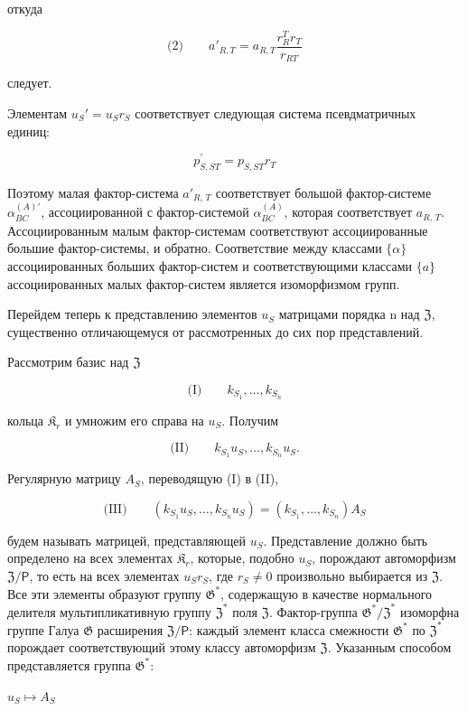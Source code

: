 \documentclass[11pt]{article}
\begin{document}
откуда

\[
\text{(2)}\qquad a'_{R,T}=a_{R,T}\frac{r_R^T r_T}{r_{RT}}
\]

следует.

Элементам \(u_S' = u_S r_S\) соответствует следующая система псевдматричных единиц:

\[p_{S,ST}^{\prime}=p_{S,ST}r_{T}\]

Поэтому малая фактор-система \(a'_{R,\,T}\) соответствует большой фактор-системе \(\alpha^{(A)\prime}_{BC}\), ассоциированной с фактор-системой \(\alpha^{(A)}_{BC}\), которая соответствует \(a_{R,\,T}\). Ассоциированным малым фактор-системам соответствуют ассоциированные большие фактор-системы, и обратно. Соответствие между классами \(\{\alpha\}\) ассоциированных больших фактор-систем и соответствующими классами \(\{a\}\) ассоциированных малых фактор-систем является изоморфизмом групп.

Перейдем теперь к представлению элементов \(u_S\) матрицами порядка n над \(\mathfrak{Z}\), существенно отличающемуся от рассмотренных до сих пор представлений.

Рассмотрим базис над \(\mathfrak Z\)

\[
\text{(I)}\qquad k_{S_1}, \ldots, k_{S_n}
\]

кольца \(\mathfrak K_r\) и умножим его справа на \(u_S\). Получим

\[
\text{(II)}\qquad k_{S_1}u_S, \ldots, k_{S_n}u_S.
\]

Регулярную матрицу \(A_S\), переводящую (I) в (II),

\[
\text{(III)}\qquad (k_{S_1}u_S, \ldots, k_{S_n}u_S) = (k_{S_1}, \ldots, k_{S_n})A_S
\]

будем называть матрицей, представляющей \(u_S\). Представление должно быть определено на всех элементах \(\mathfrak K_{r}\), которые, подобно \(u_S\), порождают автоморфизм \(\mathfrak Z/\mathsf{P}\), то есть на всех элементах \(u_Sr_S\), где \(r_S \neq 0\) произвольно выбирается из \(\mathfrak Z\). Все эти элементы образуют группу \(\mathfrak G^*\), содержащую в качестве нормального делителя мультипликативную группу \(\mathfrak Z^*\) поля \(\mathfrak Z\). Фактор-группа \(\mathfrak G^*/\mathfrak Z^*\) изоморфна группе Галуа \(\mathfrak G\) расширения \(\mathfrak Z/\mathsf{P}\): каждый элемент класса смежности \(\mathfrak G^*\) по \(\mathfrak Z^*\) порождает соответствующий этому классу автоморфизм \(\mathfrak Z\). Указанным способом представляется группа \(\mathfrak G^*\):

\(u_S \mapsto A_S\)
\end{document}
